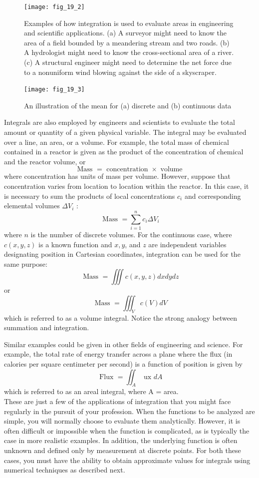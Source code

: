 \documentclass[../main.tex]{subfiles}
\begin{document}
		\begin{figure}[H]
			\centering
			\texttt{[image: fig\_19\_2]}
		   \caption{\textsf{Examples of how integration is used to evaluate areas in engineering and scientific applications. (a) A surveyor might
		   need to know the area of a field bounded by a meandering stream and two roads. (b) A hydrologist might need to
		   know the cross-sectional area of a river. (c) A structural engineer might need to determine the net force due to a
		   nonuniform wind blowing against the side of a skyscraper.}}\label{fig:fig_19_2}
		\end{figure}

		\begin{figure}[H]
			\centering
			\texttt{[image: fig\_19\_3]}
		   \caption{\textsf{An illustration of the mean for (a) discrete and (b) continuous data}}\label{fig:fig_19_3}
		\end{figure}

		Integrals are also employed by engineers and scientists to evaluate the total amount or
		quantity of a given physical variable. The integral may be evaluated over a line, an area, or
		a volume. For example, the total mass of chemical contained in a reactor is given as the
		product of the concentration of chemical and the reactor volume, or
		$$
		\text { Mass }= \text { concentration } \times \text { volume }
		$$
		where concentration has units of mass per volume. However, suppose that concentration varies from location to location within the reactor. In this case, it is necessary to sum the products of local concentrations $c_{i}$ and corresponding elemental volumes $\Delta V_{i}$ :
		$$
		\text { Mass }=\sum_{i=1}^{n} c_{i} \Delta V_{i}
		$$
		where $n$ is the number of discrete volumes. For the continuous case, where $c(x, y, z)$ is a known function and $x, y$, and $z$ are independent variables designating position in Cartesian coordinates, integration can be used for the same purpose:
		$$
		\text { Mass }=\iiint c(x, y, z) d x d y d z
		$$
		or
		$$
		\text { Mass }=\iiint_{V} c(V) d V
		$$
		which is referred to as a volume integral. Notice the strong analogy between summation and integration.
		
		Similar examples could be given in other fields of engineering and science. For example, the total rate of energy transfer across a plane where the flux (in calories per square centimeter per second) is a function of position is given by
		$$
		\text { Flux }=\iint_{A} \text { ux } d A
		$$
		which is referred to as an areal integral, where A = area.\\
		These are just a few of the applications of integration that you might face regularly in
		the pursuit of your profession. When the functions to be analyzed are simple, you will normally choose to evaluate them analytically. However, it is often difficult or impossible
		when the function is complicated, as is typically the case in more realistic examples. In addition, the underlying function is often unknown and defined only by measurement at discrete points. For both these cases, you must have the ability to obtain approximate values
		for integrals using numerical techniques as described next.
\end{document}
